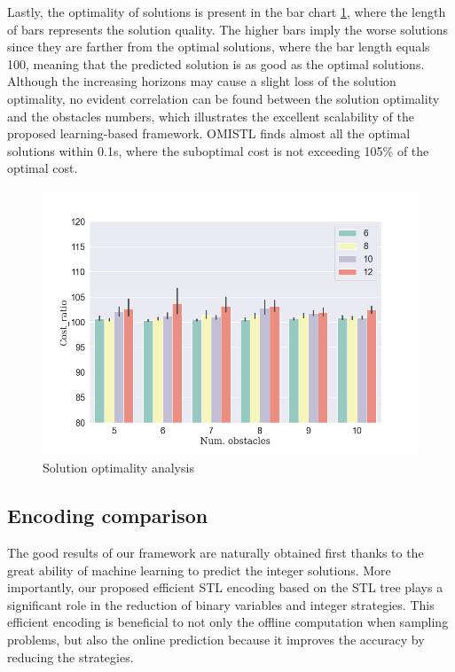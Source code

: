 \documentclass[a4paper]{report}
\begin{document}
Lastly, the optimality of solutions is present in the bar chart \ref{cost_ratios}, where the length of bars represents the solution quality. The higher bars imply the worse solutions since they are farther from the optimal solutions, where the bar length equals 100, meaning that the predicted solution is as good as the optimal solutions. Although the increasing horizons may cause a slight loss of the solution optimality, no evident correlation can be found between the solution optimality and the obstacles numbers, which illustrates the excellent scalability of the proposed learning-based framework. OMISTL finds almost all the optimal solutions within 0.1s, where the suboptimal cost is not exceeding 105\% of the optimal cost.

 \begin{figure}
    \centering
    \includegraphics[scale=0.25]{cost_ratios.png}
    \vspace{-0.4cm}
    \caption{Solution optimality analysis}
    \label{cost_ratios}
    \end{figure}

\subsection{ Encoding comparison}

The good results of our framework are naturally obtained first thanks to the great ability of machine learning to predict the integer solutions. More importantly, our proposed efficient STL encoding based on the STL tree plays a significant role in the reduction of binary variables and integer strategies. This efficient encoding is beneficial to not only the offline computation when sampling problems, but also the online prediction because it improves the accuracy by reducing the strategies. 
\end{document}
